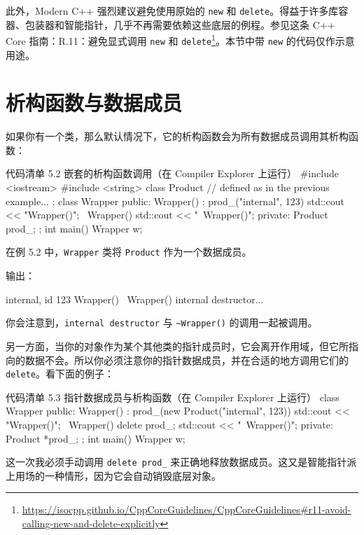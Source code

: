 \begin{myInfoBox}
此外，Modern C++ 强烈建议避免使用原始的 \texttt{new} 和 \texttt{delete}。得益于许多库容器、包装器和智能指针，几乎不再需要依赖这些底层的例程。参见这条 C++ Core 指南：R.11：避免显式调用 \texttt{new} 和 \texttt{delete}\footnote{\url{https://isocpp.github.io/CppCoreGuidelines/CppCoreGuidelines\#r11-avoid-calling-new-and-delete-explicitly}}。本节中带 \texttt{new} 的代码仅作示意用途。
\end{myInfoBox}

\section{析构函数与数据成员}

如果你有一个类，那么默认情况下，它的析构函数会为所有数据成员调用其析构函数：

\begin{codeboxt}[cpp]{代码清单 5.2 嵌套的析构函数调用（在 Compiler Explorer 上运行）}
#include <iostream>
#include <string>
class Product {
// defined as in the previous example...
};
class Wrapper {
public:
Wrapper() : prod_("internal", 123) { std::cout << "Wrapper()\n"; }
~Wrapper() { std::cout << "~Wrapper()\n"; }
private:
Product prod_;
};
int main() {
Wrapper w;
}
\end{codeboxt}


在例 5.2 中，\texttt{Wrapper} 类将 \texttt{Product} 作为一个数据成员。

输出：

\begin{codebox}[cpp]
internal, id 123
Wrapper()
~Wrapper()
internal destructor...
\end{codebox}

你会注意到，\texttt{internal destructor} 与 \texttt{\textasciitilde Wrapper()} 的调用一起被调用。

另一方面，当你的对象作为某个其他类的指针成员时，它会离开作用域，但它所指向的数据不会。所以你必须注意你的指针数据成员，并在合适的地方调用它们的 \texttt{delete}。看下面的例子：

\begin{codeboxt}[cpp]{代码清单 5.3 指针数据成员与析构函数（在 Compiler Explorer 上运行）}
class Wrapper {
public:
Wrapper() : prod_(new Product("internal", 123)) {
std::cout << "Wrapper()\n";
}
~Wrapper() {
delete prod_;
std::cout << "~Wrapper()\n";
}
private:
Product *prod_;
};
int main() {
Wrapper w;
}
\end{codeboxt}

这一次我必须手动调用 \texttt{delete prod\_} 来正确地释放数据成员。这又是智能指针派上用场的一种情形，因为它会自动销毁底层对象。

